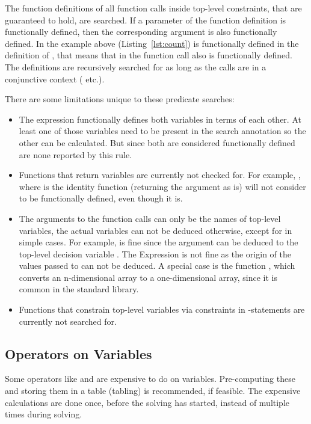\documentclass[a4paper,12pt]{article}
\begin{document}
The function definitions of all function calls inside top-level constraints, that are
guaranteed to hold, are searched. If a parameter of the function definition is
functionally defined, then the corresponding argument is also functionally defined. In the
example above (Listing~\ref{lst:count}) is  functionally defined in the definition
of , that means that  in the function call  also is
functionally defined. The definitions are recursively searched for as long as the calls
are in a conjunctive context (\mi{/\\} etc.).

There are some limitations unique to these predicate searches:
\begin{itemize}
  \item The expression  functionally defines both variables in terms of each other.
  At least one of those variables need to be present in the search annotation so the other
  can be calculated. But since both are considered functionally defined are none reported
  by this rule.
  \item
  \begin{sloppypar}
  Functions that return variables are currently not checked for. For example, , where
   is the identity function (returning the argument as is) will not consider 
  to be functionally defined, even though it is.
  \end{sloppypar}
  \item The arguments to the function calls can only be the names of top-level variables,
  the actual variables can not be deduced otherwise, except for in simple cases. For
  example,  is fine since the argument can be deduced to the top-level decision
  variable . The Expression  is not fine as the origin of the
  values passed to  can not be deduced. A special case is the function ,
  which converts an n-dimensional array to a one-dimensional array, since it is common in
  the standard library.
  \item Functions that constrain top-level variables via constraints in
  -statements are currently not searched for.
\end{itemize}

\subsection{Operators on Variables}\label{sec:rule:opvar}
Some operators like  and  are expensive to do on variables. Pre-computing
these and storing them in a table (tabling) is recommended, if feasible. The expensive
calculations are done once, before the solving has started, instead of multiple times
during solving.
\end{document}
